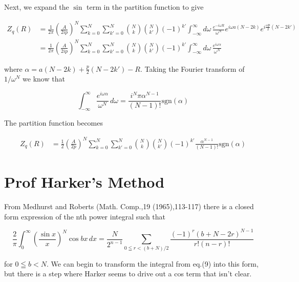 \documentclass[a4paper,12pt,titlepage]{report}
\begin{document}
Next, we expand the $\sin$ term in the partition function to give

\begin{align}
Z_{q}\left(R\right) &= \frac{1}{2 \pi} \left(\frac{A}{2ip}\right)^{N}\sum^{N}_{k=0}\sum^{N}_{k'=0}\binom{N}{k}\binom{N}{k'}(-1)^{k'}\int_{-\infty}^{\infty}d\omega\, \frac{e^{-i\omega R}}{\omega^{N}} e^{i\omega a(N-2k)}e^{i\frac{\omega p}{2}(N-2k')}\\
&= \frac{1}{2 \pi} \left(\frac{A}{2ip}\right)^{N}\sum^{N}_{k=0}\sum^{N}_{k'=0}\binom{N}{k}\binom{N}{k'}(-1)^{k'}\int_{-\infty}^{\infty}d\omega\, \frac{e^{i\omega \alpha}}{\omega^{N}} 
\end{align}

where $\alpha = a(N-2k) + \frac{p}{2}(N-2k') -R$. Taking the Fourier transform of $1/\omega^{N}$ we know that 

\begin{equation}
\int_{-\infty}^{\infty}\frac{e^{i \omega \alpha}}{\omega^{N}}\,d\omega = \frac{i^{N} \pi \alpha^{N-1}}{\left(N-1\right)!}\text{sgn}\left(\alpha\right)
\end{equation}

The partition function becomes

\begin{align}
Z_{q}\left(R\right) &= \frac{1}{2}\left(\frac{A}{2p}\right)^{N}\sum^{N}_{k=0}\sum^{N}_{k'=0}\binom{N}{k}\binom{N}{k'}(-1)^{k'}\frac{\alpha^{N-1}}{\left(N-1\right)!}\text{sgn}\left(\alpha\right)
\end{align}

\section*{Prof Harker's Method}

From Medhurst and Roberts (Math. Comp.,19 (1965),113-117) there is a closed form expression of the nth power integral such that

\begin{equation}
\frac{2}{\pi}\int_{0}^{\infty}\left(\frac{\sin x}{x}\right)^{N}\cos bx \,dx = \frac{N}{2^{n-1}}\sum_{0 \leqq r < \left(b+N\right)/2} \frac{\left(-1\right)^{r}\left( b+N-2r \right)^{N-1}}{r!\left(n-r\right)!}
\end{equation}

for $0 \leqq b < N$. We can begin to transform the integral from eq.(9) into this form, but there is a step where Harker seems to drive out a cos term that isn't clear.
\end{document}
